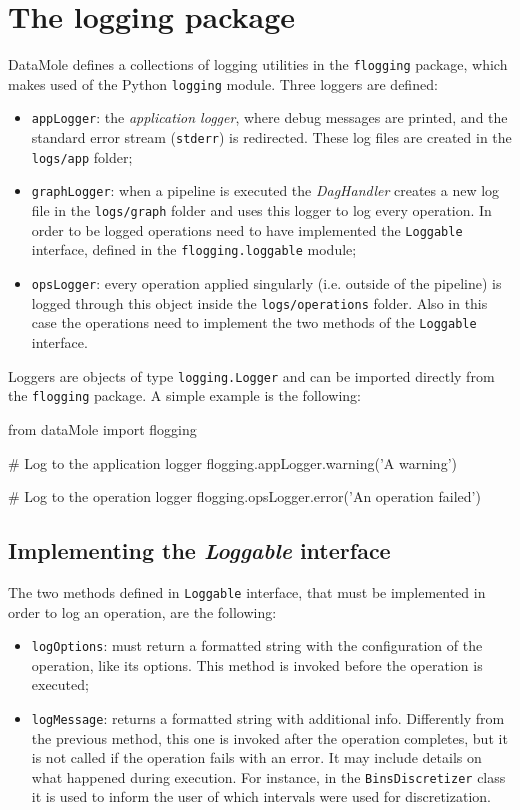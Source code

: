 \section{The logging package}\label{sec:flogging}
DataMole defines a collections of logging utilities in the \texttt{flogging} package, which makes used of the Python \texttt{logging} module. Three loggers are defined:
\begin{itemize}
	\item \texttt{appLogger}: the \textit{application logger}, where debug messages are printed, and the standard error stream (\texttt{stderr}) is redirected. These log files are created in the \texttt{logs/app} folder;
	\item \texttt{graphLogger}: when a pipeline is executed the \textit{DagHandler} creates a new log file in the \texttt{logs/graph} folder and uses this logger to log every operation. In order to be logged operations need to have implemented the \texttt{Loggable} interface, defined in the \texttt{flogging.loggable} module;
	\item \texttt{opsLogger}: every operation applied singularly (i.e. outside of the pipeline) is logged through this object inside the \texttt{logs/operations} folder. Also in this case the operations need to implement the two methods of the \texttt{Loggable} interface.
\end{itemize}
Loggers are objects of type \texttt{logging.Logger} and can be imported directly from the \texttt{flogging} package. A simple example is the following:\\
\begin{python}
	from dataMole import flogging
	
	# Log to the application logger
	flogging.appLogger.warning('A warning')
	
	# Log to the operation logger
	flogging.opsLogger.error('An operation failed')
\end{python}

\subsection{Implementing the \textit{Loggable} interface}
The two methods defined in \texttt{Loggable} interface, that must be implemented in order to log an operation, are the following:
\begin{itemize}
	\item \texttt{logOptions}: must return a formatted string with the configuration of the operation, like its options. This method is invoked before the operation is executed;
	\item \texttt{logMessage}: returns a formatted string with additional info. Differently from the previous method, this one is invoked after the operation completes, but it is not called if the operation fails with an error. It may include details on what happened during execution. For instance, in the \texttt{BinsDiscretizer} class it is used to inform the user of which intervals were used for discretization.
\end{itemize}


